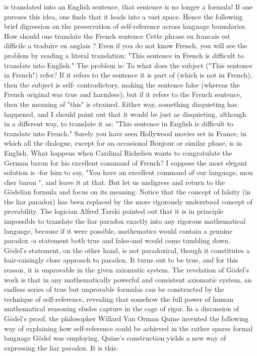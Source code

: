 is translated into an English sentence, that sentence is no longer a formula! If one pursues this idea, one finds that it leads into a vast space. Hence the following brief digression on the preservation of self-reference across language boundaries. How should one translate the French sentence Cette phrase en francais est difficile a traduire en anglais ? Even if you do not know French, you will see the problem by reading a literal translation: "This sentence in French is difficult to translate into English." The problem is: To what does the subject ("This sentence in French") refer? If it refers to the sentence it is part of (which is not in French), then the subject is self- contradictory, making the sentence false (whereas the French original was true and harmless); but if it refers to the French sentence, then the meaning of "this" is strained. Either way, something disquieting has happened, and I should point out that it would be just as disquieting, although in a different way, to translate it as: "This sentence in English is difficult to translate into French." Surely you have seen Hollywood movies set in France, in which all the dialogue, except for an occasional Bonjour or similar phase, is in English. What happens when Cardinal Richelieu wants to congratulate the German baron for his excellent command of French? I suppose the most elegant solution is -for him to say, "You have an excellent command of our language, mon cher baron ", and leave it at that. But let us undigress and return to the Gödelian formula and focus on its meaning. Notice that the concept of falsity (in the liar paradox) has been replaced by the more rigorously understood concept of provability. The logician Alfred Tarski pointed out that it is in principle impossible to translate the liar paradox exactly into any rigorous mathematical language, because if it were possible, mathematics would contain a genuine paradox -a statement both true and false-and would come tumbling down. Gödel’s statement, on the other hand, is not paradoxical, though it constitutes a hair-raisingly close approach to paradox. It turns out to be true, and for this reason, it is unprovable in the given axiomatic system. The revelation of Gödel’s work is that in any mathematically powerful and consistent axiomatic system, an endless series of true but unprovable formulas can be constructed by the technique of self-reference, revealing that somehow the full power of human mathematical reasoning eludes capture in the cage of rigor. In a discussion of Gödel’s proof, the philosopher Willard Van Orman Quine invented the following way of explaining how self-reference could be achieved in the rather sparse formal language Gödel was employing. Quine's construction yields a new way of expressing the liar paradox. It is this: 



